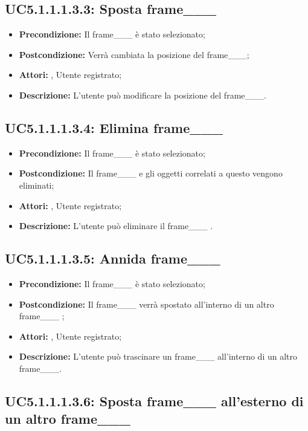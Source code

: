 \subsection{ UC5.1.1.1.3.3: Sposta frame___}

\begin{itemize}
	\item \textbf{Precondizione:} Il frame___ è stato selezionato;
	\item \textbf{Postcondizione:} Verrà cambiata la posizione del frame___;
	\item \textbf{Attori:} , Utente registrato;
	\item \textbf{Descrizione:} L'utente può modificare la posizione del frame___.
\end{itemize}
\subsection{ UC5.1.1.1.3.4: Elimina frame___}

\begin{itemize}
	\item \textbf{Precondizione:} Il frame___ è stato selezionato;
	\item \textbf{Postcondizione:} Il frame___ e gli oggetti correlati a questo vengono eliminati;
	\item \textbf{Attori:} , Utente registrato;
	\item \textbf{Descrizione:} L'utente può eliminare il frame___ .
\end{itemize}
\subsection{ UC5.1.1.1.3.5: Annida frame___}

\begin{itemize}
	\item \textbf{Precondizione:} Il frame___ è stato selezionato;
	\item \textbf{Postcondizione:} Il frame___ verrà spostato all'interno di un altro frame___  ;
	\item \textbf{Attori:} , Utente registrato;
	\item \textbf{Descrizione:} L'utente può trascinare un frame___ all'interno di un altro frame___.
\end{itemize}
\subsection{ UC5.1.1.1.3.6: Sposta frame___ all'esterno di un altro frame___  }

